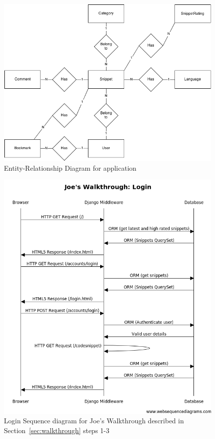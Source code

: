 \documentclass{sig-alt-release2}
\begin{document}
\begin{figure}
\centering
\includegraphics[scale=0.6]{../imgs/ERDiagram.png}
\caption{Entity-Relationship Diagram for application}
\label{fig:erdiag}
\end{figure}

\begin{figure}
\centering
\includegraphics[scale=0.6]{../imgs/walkthroughseqdiag-login.png}
\caption{Login Sequence diagram for Joe's Walkthrough described in
Section~\ref{sec:walkthrough} steps 1-3}
\label{fig:loginseqdiag}
\end{figure}
\end{document}
